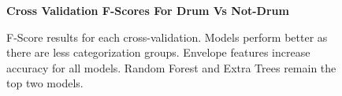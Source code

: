 \documentclass[\main/thesis.tex]{subfiles}
\begin{document}
\begin{figure}[h!]   

    \begin{center}
        \textbf{Cross Validation F-Scores For Drum Vs Not-Drum}
    \caption{F-Score results for each cross-validation. Models perform better as there are less categorization groups. Envelope features increase accuracy for all models. Random Forest and Extra Trees remain the top two models. }
    \label{fig:f1_dvn_box}
    \end{center}

\end{figure}
\end{document}

